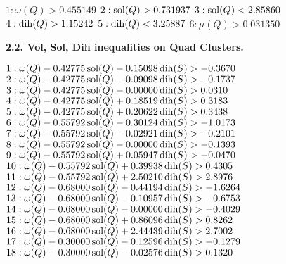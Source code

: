 $1:  \omega(Q) > 0.455149$\newline
$2:  \operatorname{sol}(Q) > 0.731937$\newline
$3:  \operatorname{sol}(Q) < 2.85860$\newline
$4:  \operatorname{dih}(Q) > 1.15242$\newline
$5:  \operatorname{dih}(Q) < 3.25887$\newline
$6:  \mu(Q) > 0.031350$\newline

\smallskip

{\bf 2.2. Vol, Sol, Dih inequalities on Quad Clusters.}

\smallskip

$1:  \omega(Q) - 0.42775 \operatorname{sol}(Q) - 0.15098 \operatorname{dih}(S) > -0.3670$\newline
$2:  \omega(Q) - 0.42775 \operatorname{sol}(Q) - 0.09098 \operatorname{dih}(S) > -0.1737$\newline
$3:  \omega(Q) - 0.42775 \operatorname{sol}(Q) - 0.00000 \operatorname{dih}(S) > 0.0310$\newline
$4:  \omega(Q) - 0.42775 \operatorname{sol}(Q) + 0.18519 \operatorname{dih}(S) > 0.3183$\newline
$5:  \omega(Q) - 0.42775 \operatorname{sol}(Q) + 0.20622 \operatorname{dih}(S) > 0.3438$\newline
$6:  \omega(Q) - 0.55792 \operatorname{sol}(Q) - 0.30124 \operatorname{dih}(S) > -1.0173$\newline
$7:  \omega(Q) - 0.55792 \operatorname{sol}(Q) - 0.02921 \operatorname{dih}(S) > -0.2101$\newline
$8:  \omega(Q) - 0.55792 \operatorname{sol}(Q) - 0.00000 \operatorname{dih}(S) > -0.1393$\newline
$9:  \omega(Q) - 0.55792 \operatorname{sol}(Q) + 0.05947 \operatorname{dih}(S) > -0.0470$\newline
$10:  \omega(Q) - 0.55792 \operatorname{sol}(Q) + 0.39938 \operatorname{dih}(S) > 0.4305$\newline
$11:  \omega(Q) - 0.55792 \operatorname{sol}(Q) + 2.50210 \operatorname{dih}(S) > 2.8976$\newline
$12:  \omega(Q) - 0.68000 \operatorname{sol}(Q) - 0.44194 \operatorname{dih}(S) > -1.6264$\newline
$13:  \omega(Q) - 0.68000 \operatorname{sol}(Q) - 0.10957 \operatorname{dih}(S) > -0.6753$\newline
$14:  \omega(Q) - 0.68000 \operatorname{sol}(Q) - 0.00000 \operatorname{dih}(S) > -0.4029$\newline
$15:  \omega(Q) - 0.68000 \operatorname{sol}(Q) + 0.86096 \operatorname{dih}(S) > 0.8262$\newline
$16:  \omega(Q) - 0.68000 \operatorname{sol}(Q) + 2.44439 \operatorname{dih}(S) > 2.7002$\newline
$17:  \omega(Q) - 0.30000 \operatorname{sol}(Q) - 0.12596 \operatorname{dih}(S) > -0.1279$\newline
$18:  \omega(Q) - 0.30000 \operatorname{sol}(Q) - 0.02576 \operatorname{dih}(S) > 0.1320$\newline
